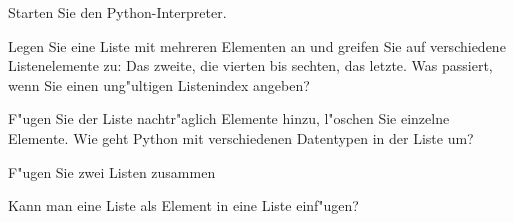 \newpage
\begin{aufgabe}[Listen]
Starten Sie den Python-Interpreter.
\begin{auflistung}
\item Legen Sie eine Liste mit mehreren Elementen an und greifen Sie auf verschiedene Listenelemente zu: Das zweite, die vierten bis sechten, das letzte. Was passiert, wenn Sie einen ung"ultigen Listenindex angeben?
\item F"ugen Sie der Liste nachtr"aglich Elemente hinzu, l"oschen Sie einzelne Elemente. Wie geht Python mit verschiedenen Datentypen in der Liste um?
\item F"ugen Sie zwei Listen zusammen
\item Kann man eine Liste als Element in eine Liste einf"ugen?
\end{auflistung}
\end{aufgabe}

